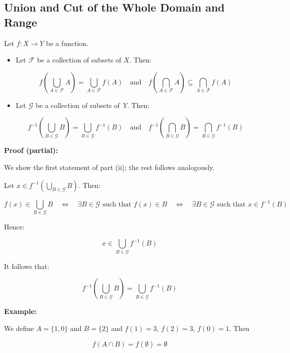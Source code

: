 \QED

\subsection{Union and Cut of the Whole Domain and Range}

Let \( f : X \to Y \) be a function.

\begin{itemize}

	\item Let \( \mathcal{F} \) be a collection of subsets of \(X\). Then:

	      \[
		      f\left( \bigcup_{A \in \mathcal{F}} A \right) = \bigcup_{A \in \mathcal{F}} f(A)
		      \quad \text{and} \quad
		      f\left( \bigcap_{A \in \mathcal{F}} A \right) \subseteq \bigcap_{A \in \mathcal{F}} f(A)
	      \]

	\item Let \( \mathcal{G} \) be a collection of subsets of \emph{Y}. Then:

	      \[
		      f^{-1}\left( \bigcup_{B \in \mathcal{G}} B \right) = \bigcup_{B \in \mathcal{G}} f^{-1}(B)
		      \quad \text{and} \quad
		      f^{-1}\left( \bigcap_{B \in \mathcal{G}} B \right) = \bigcap_{B \in \mathcal{G}} f^{-1}(B)
	      \]

\end{itemize}

\textbf{Proof (partial):}

We show the first statement of part (ii); the rest follows analogously.

Let \( x \in f^{-1} \left( \bigcup_{B \in \mathcal{G}} B \right) \). Then:

\[
	f(x) \in \bigcup_{B \in \mathcal{G}} B
	\quad \Leftrightarrow \quad
	\exists B \in \mathcal{G} \text{ such that } f(x) \in B
	\quad \Leftrightarrow \quad
	\exists B \in \mathcal{G} \text{ such that } x \in f^{-1}(B)
\]

Hence:

\[
	x \in \bigcup_{B \in \mathcal{G}} f^{-1}(B)
\]

It follows that:

\[
	f^{-1} \left( \bigcup_{B \in \mathcal{G}} B \right) = \bigcup_{B \in \mathcal{G}} f^{-1}(B)
\]

\QED

\textbf{Example:}

We define \(A = \{1, 0\}\) and \(B = \{2\}\) and \(f(1) = 3\), \(f(2) = 3\), \(f(0) = 1\). Then

\[
	f(A \cap B) = f( \emptyset) = \emptyset
\]


